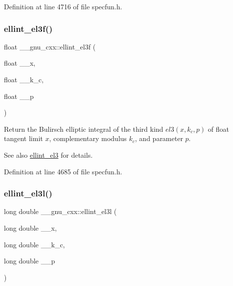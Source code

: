 Definition at line 4716 of file specfun.\+h.

\mbox{\label{group__gnu__math__spec__func_ga66131a8ecc14b5228a73a01121f60a35}} 
\subsubsection{\texorpdfstring{ellint\+\_\+el3f()}{ellint\_el3f()}}
{\footnotesize\ttfamily float \+\_\+\+\_\+gnu\+\_\+cxx\+::ellint\+\_\+el3f (\begin{DoxyParamCaption}\item[{float}]{\+\_\+\+\_\+x,  }\item[{float}]{\+\_\+\+\_\+k\+\_\+c,  }\item[{float}]{\+\_\+\+\_\+p }\end{DoxyParamCaption})\hspace{0.3cm}{\ttfamily [inline]}}

Return the Bulirsch elliptic integral of the third kind $ el3(x,k_c,p) $ of {\ttfamily float} tangent limit $ x $, complementary modulus $ k_c $, and parameter $ p $.

\begin{DoxySeeAlso}{See also}
\hyperlink{group__gnu__math__spec__func_gaac07922e08fdf46cd509ff0cfa9ea1f0}{ellint\+\_\+el3} for details. 
\end{DoxySeeAlso}


Definition at line 4685 of file specfun.\+h.

\mbox{\label{group__gnu__math__spec__func_ga0d90e66f799a2ebe4bec43eef0d53355}} 
\subsubsection{\texorpdfstring{ellint\+\_\+el3l()}{ellint\_el3l()}}
{\footnotesize\ttfamily long double \+\_\+\+\_\+gnu\+\_\+cxx\+::ellint\+\_\+el3l (\begin{DoxyParamCaption}\item[{long double}]{\+\_\+\+\_\+x,  }\item[{long double}]{\+\_\+\+\_\+k\+\_\+c,  }\item[{long double}]{\+\_\+\+\_\+p }\end{DoxyParamCaption})\hspace{0.3cm}{\ttfamily [inline]}}

